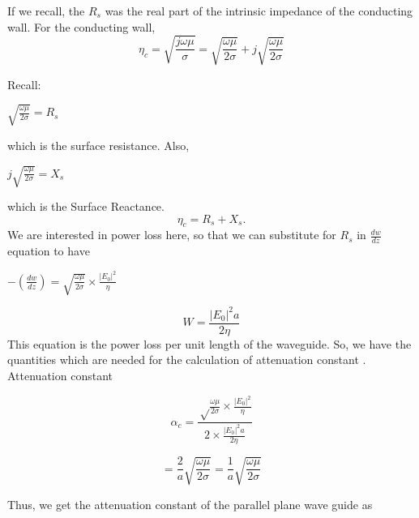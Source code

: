 If we recall, the $R_s$ was the real part of the intrinsic impedance of the conducting wall. For the conducting wall,
$$\eta_c = \sqrt{\frac{j\omega\mu}{\sigma}}= \sqrt{\frac{\omega\mu}{2\sigma}}+j\sqrt{\frac{\omega\mu}{2\sigma}}$$

Recall:
\begin{center}
$\sqrt{\frac{\omega\mu}{2\sigma}}=R_s$	
\end{center}
which is the surface resistance. Also,
\begin{center}
$j\sqrt{\frac{\omega\mu}{2\sigma}}=X_s$
\end{center}
which is the Surface Reactance.
\begin{equation}
\eta_c = R_s + X_s.
\end{equation}
We are interested in power loss here, so that we can substitute for $R_s$ in $\frac{dw}{dz}$ equation to have
\begin{center}
$-(\frac{dw}{dz})=\sqrt{\frac{\omega\mu}{2\sigma}}\times\frac{|E_0|^2}{\eta}$
\end{center}
\begin{equation}
W=\frac{|E_0|^2 a}{2\eta}
\end{equation}
This equation is the power loss per unit length of the waveguide. So, we have the quantities which are needed for the  calculation of attenuation constant .
Attenuation constant 
\begin{center}
$$\alpha_c = \frac{\sqrt\frac{\omega\mu}{2 \sigma}\times\frac{|E_0|^2}{\eta}}{2 \times \frac{|E_0|^2 a}{2 \eta}}$$

$$= \frac{2}{a}\sqrt{\frac{\omega\mu}{2\sigma}}=\frac{1}{a}\sqrt{\frac{\omega\mu}{2\sigma}}$$	
\end{center}
Thus, we get the attenuation constant of the parallel plane wave guide as

